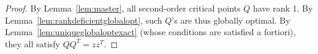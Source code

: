 \documentclass{colt2016} %
\newcommand{\1}{\mathbf{1}}
\begin{document}
\begin{proof}
	By Lemma~\ref{lem:master}, all second-order critical points $Q$ have rank 1. By Lemma~\ref{lem:rankdeficientglobalopt}, such $Q$'s are thus globally optimal. By Lemma~\ref{lem:uniqueglobaloptexact} (whose conditions are satisfied a fortiori), they all satisfy $QQ^T = zz^T$.
\end{proof}


\end{document}
